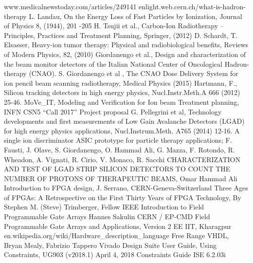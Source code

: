 \begin{thebibliography}{00}	
	www.medicalnewstoday.com/articles/249141
	enlight.web.cern.ch/what-is-hadron-therapy
	L. Landau, On the Energy Loss of Fast Particles by Ionization, Journal of
	Physics 8, (1944), 201 -205
	H. Tsujii et al., Carbon-Ion Radiotherapy – Principles, Practices and Treatment
	Planning, Springer, (2012)
	D. Schardt, T. Elsasser, Heavy-ion tumor therapy: Physical and radiobiological
	benefits, Reviews of Modern Physics, 82, (2010)
	Giordanengo et al., Design and characterization of the beam monitor detectors
	of the Italian National Center of Oncological Hadron-therapy (CNAO).
	S. Giordanengo et al , The CNAO Dose Delivery System for ion pencil beam
	scanning radiotherapy, Medical Physics (2015)
	Hartmann, F., Silicon tracking detectors in high energy physics, Nucl.Instr.Meth.A
	666 (2012) 25-46.
	MoVe\_IT, Modeling and Verification for Ion beam Treatment planning, INFN CSN5 “Call 2017” Project proposal
	G. Pellegrini et al, Technology developments and first measurements of Low Gain Avalanche Detectors (LGAD) for high energy physics applications, Nucl.Instrum.Meth. A765 (2014) 12-16.
	A single ion discriminator ASIC prototype for particle therapy applications; F. Fausti, J. Olave, S. Giordanengo, O. Hammad Ali, G. Mazza, F. Rotondo, R. Wheadon, A. Vignati, R. Cirio, V. Monaco, R. Sacchi
	CHARACTERIZATION AND TEST OF LGAD STRIP SILICON DETECTORS TO COUNT THE NUMBER OF PROTONS OF THERAPEUTIC BEAMS, Omar Hammad Ali
	Introduction to FPGA design, J. Serrano, CERN-Geneva-Switzerland
	Three Ages of FPGAs: A Retrospective on the First Thirty Years of FPGA Technology, By Stephen M. (Steve) Trimberger, Fellow IEEE
	Introduction to Field Programmable Gate Arrays Hannes Sakulin CERN / EP-CMD
	Field Programmable Gate Arrays and Applications, Version 2 EE IIT, Kharagpur
	en.wikipedia.org/wiki/Hardware\_description\_language
	Free Range VHDL, Bryan Mealy, Fabrizio Tappero
	Vivado Design Suite User Guide, Using Constraints, UG903 (v2018.1) April 4, 2018
	\thispagestyle{plain}
	Constraints Guide ISE 6.2.03i

\end{thebibliography}
